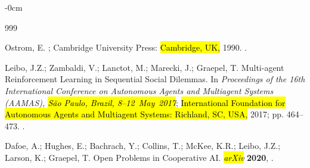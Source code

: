 \documentclass[mca,article,accept,pdftex,oneauthor]{Definitions/mdpi}
\begin{document}
\begin{adjustwidth}{-\extralength}{0cm}



\begin{thebibliography}{999}

Ostrom, E.
; Cambridge University Press: \hl{Cambridge, UK,} %
 1990.
.

Leibo, J.Z.; Zambaldi, V.; Lanctot, M.; Marecki, J.; Graepel, T.
\newblock Multi-agent Reinforcement Learning in Sequential Social Dilemmas.
\newblock In \emph{Proceedings of the 16th International Conference on Autonomous
  Agents and Multiagent Systems (AAMAS), \hl{São Paulo, Brazil,  \mbox{8--12 May 2017}}};     \hl{International Foundation for Autonomous Agents and Multiagent Systems: Richland, SC, USA,} 2017; pp. 464--473.
.

Dafoe, A.; Hughes, E.; Bachrach, Y.; Collins, T.; McKee, K.R.; Leibo, J.Z.;
  Larson, K.; Graepel, T.
\newblock Open Problems in Cooperative {AI}.
\newblock \emph{\hl{arXiv}}  %
\textbf{2020}, 
.


\end{thebibliography}
\end{adjustwidth}
\end{document}
